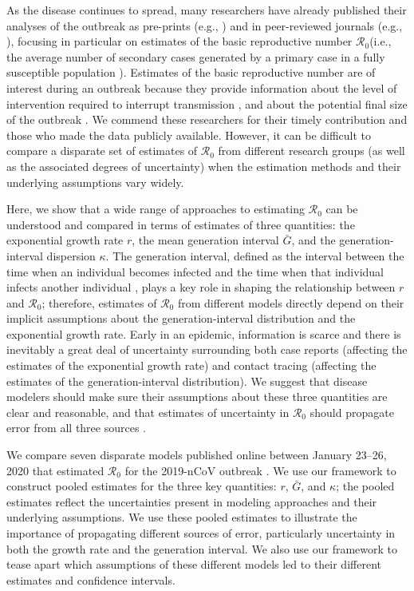\documentclass[12pt]{article}
\newcommand{\Ro}{\ensuremath{{\mathcal R}_{0}}\xspace}
\begin{document}
As the disease continues to spread, many researchers have already published their analyses of the outbreak as pre-prints (e.g., \cite{bedfordncov, imaincov, liuncov, majumderncov, readncov, zhaoncov}) and in peer-reviewed journals (e.g., \cite{li2020early, riou2020pattern, wu2020nowcasting, zhao2020preliminary}), focusing in particular on estimates of the basic reproductive number \Ro (i.e., the average number of secondary cases generated by a primary case in a fully susceptible population \citep{anderson1991infectious, diekmann1990definition}).
Estimates of the basic reproductive number are of interest during an outbreak because they provide information about the level of intervention required to interrupt transmission \citep{anderson1991infectious}, and about the potential final size of the outbreak \citep{anderson1991infectious, ma2006generality}.
We commend these researchers for their timely contribution and those who made the data publicly available.
However, it can be difficult to compare a disparate set of estimates of \Ro from different research groups (as well as the associated degrees of uncertainty) when the estimation methods and their underlying assumptions vary widely.

Here, we show that a wide range of approaches to estimating \Ro can be understood and compared in terms of estimates of three quantities: the exponential growth rate $r$, the mean generation interval $\bar G$, and the generation-interval dispersion $\kappa$.
The generation interval, defined as the interval between the time when an individual becomes infected and the time when that individual infects another individual \citep{svensson2007note}, plays a key role in shaping the relationship between $r$ and \Ro \citep{wearing2005appropriate, roberts2007model, wallinga2007generation, park2019practical};
therefore, estimates of \Ro from different models directly depend on their implicit assumptions about the generation-interval distribution and the exponential growth rate.
Early in an epidemic, information is scarce and there is inevitably a great deal of uncertainty surrounding both case reports (affecting the estimates of the exponential growth rate) and contact tracing (affecting the estimates of the generation-interval distribution).
We suggest that disease modelers should make sure their assumptions about these three quantities are clear and reasonable, and that estimates of uncertainty in \Ro should propagate error from all three sources \citep{elderd2006uncertainty}.

We compare seven disparate models published online between January 23--26, 2020 that estimated \Ro for the 2019-nCoV outbreak \citep{bedfordncov, imaincov, liuncov, majumderncov, readncov, riouncov, zhaoncov}. 
We use our framework to construct pooled estimates for the three key quantities: $r$, $\bar G$, and $\kappa$;
the pooled estimates reflect the uncertainties present in modeling approaches and their underlying assumptions.
We use these pooled estimates to illustrate the importance of propagating different sources of error, particularly uncertainty in both the growth rate and the generation interval. 
We also use our framework to tease apart which assumptions of these different models led to their different estimates and confidence intervals.
\end{document}
